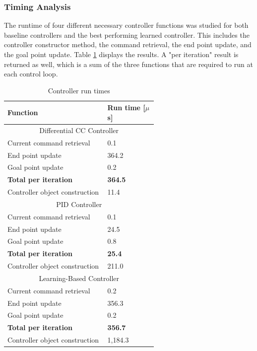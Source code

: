 \subsubsection{Timing Analysis}
The runtime of four different necessary controller functions was studied for both baseline controllers and the best performing learned controller. This includes the controller constructor method, the command retrieval, the end point update, and the goal point update. Table \ref{tab:runtimes} displays the results. A "per iteration" result is returned as well, which is a sum of the three functions that are required to run at each control loop. 

\begin{table}[h]
    \centering   
    \caption{Controller run times}
    \begin{tabular}{p{0.4\linewidth} | p{0.2\linewidth} }
        \textbf{Function} & \textbf{Run time [$\mu$s]} \\
        \hline
        \multicolumn{2}{c}{Differential CC Controller} \\
        \hline
        Current command retrieval & 0.1 \\
        End point update & 364.2 \\
        Goal point update & 0.2 \\
        \textbf{Total per iteration} & \textbf{364.5} \\
        Controller object construction & 11.4 \\
        \hline
        \multicolumn{2}{c}{PID Controller} \\
        \hline
        Current command retrieval & 0.1 \\
        End point update & 24.5 \\
        Goal point update & 0.8 \\
        \textbf{Total per iteration} & \textbf{25.4} \\
        Controller object construction & 211.0 \\
        \hline
        \multicolumn{2}{c}{Learning-Based Controller} \\
        \hline
        Current command retrieval & 0.2 \\
        End point update & 356.3 \\
        Goal point update & 0.2 \\
        \textbf{Total per iteration} & \textbf{356.7} \\
        Controller object construction & 1,184.3 \\
        \hline
    \end{tabular}
    \label{tab:runtimes}
\end{table}

